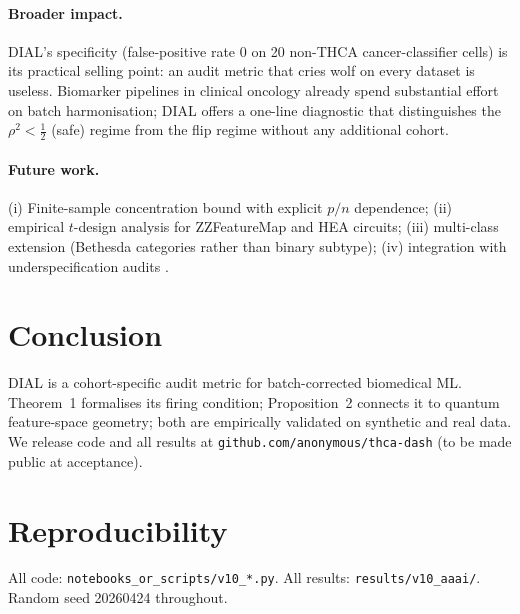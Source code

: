 \documentclass[letterpaper,11pt]{article}
\begin{document}
\paragraph{Broader impact.}
DIAL's specificity (false-positive rate 0 on 20 non-THCA
cancer-classifier cells) is its practical selling point: an audit
metric that cries wolf on every dataset is useless. Biomarker
pipelines in clinical oncology already spend substantial effort on
batch harmonisation; DIAL offers a one-line diagnostic that
distinguishes the $\rho^2<\tfrac12$ (safe) regime from the flip
regime without any additional cohort.

\paragraph{Future work.}
(i) Finite-sample concentration bound with explicit
$p/n$ dependence; (ii) empirical $t$-design analysis for
ZZFeatureMap and HEA circuits; (iii) multi-class extension
(Bethesda categories rather than binary subtype); (iv) integration
with underspecification audits \cite{damour2020}.

\section{Conclusion}
DIAL is a cohort-specific audit metric for batch-corrected biomedical
ML. Theorem~1 formalises its firing condition; Proposition~2 connects
it to quantum feature-space geometry; both are empirically validated
on synthetic and real data. We release code and all results at
\texttt{github.com/anonymous/thca-dash} (to be made public at
acceptance).

\section*{Reproducibility}
All code: \texttt{notebooks\_or\_scripts/v10\_*.py}.
All results: \texttt{results/v10\_aaai/}.
Random seed 20260424 throughout.
\end{document}

